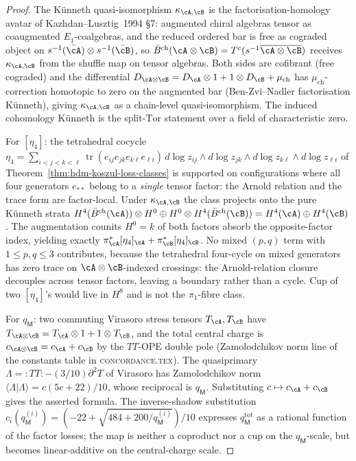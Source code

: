 \begin{proof}
The K\"unneth quasi-isomorphism $\kappa_{\cA,\cB}$ is the
factorisation-homology avatar of
Kazhdan--Lusztig~\textup{1994 §7}: augmented chiral algebras tensor
as coaugmented $E_1$-coalgebras, and the reduced ordered bar is
free as cograded object on $s^{-1}(\bar\cA)\otimes s^{-1}(\bar\cB)$,
so $\bar B^{\mathrm{ch}}(\cA\otimes\cB) = T^c(s^{-1}\overline{\cA\otimes\cB})$
receives $\kappa_{\cA,\cB}$ from the shuffle map on tensor algebras.
Both sides are cofibrant (free cograded) and the differential
$D_{\cA\otimes\cB} = D_\cA\otimes 1 + 1\otimes D_\cB + \mu_{\mathrm{ch}}$
has $\mu_{\mathrm{ch}}$-correction homotopic to zero on the
augmented bar (Ben-Zvi--Nadler factorisation K\"unneth), giving
$\kappa_{\cA,\cB}$ as a chain-level quasi-isomorphism. The induced
cohomology K\"unneth is the split-$\mathrm{Tor}$ statement over a
field of characteristic zero.

For $[\eta_4]$: the tetrahedral cocycle
$\eta_4 = \sum_{i<j<k<\ell}\operatorname{tr}(e_{ij}e_{jk}e_{k\ell}e_{\ell i})\,
d\log z_{ij}\wedge d\log z_{jk}\wedge d\log z_{k\ell}\wedge d\log z_{\ell i}$
of Theorem~\ref{thm:hdm-koszul-loss-classes} is supported on
configurations where all four generators $e_{**}$ belong to a
\emph{single} tensor factor: the Arnold relation and the trace form
are factor-local. Under $\kappa_{\cA,\cB}$ the class projects
onto the pure K\"unneth strata $H^4(\bar B^{\mathrm{ch}}(\cA))\otimes
H^0 \oplus H^0 \otimes H^4(\bar B^{\mathrm{ch}}(\cB))
= H^4(\cA)\oplus H^4(\cB)$. The augmentation counits $H^0 = k$ of
both factors absorb the opposite-factor index, yielding exactly
$\pi_\cA^\ast[\eta_4]_\cA + \pi_\cB^\ast[\eta_4]_\cB$. No mixed
$(p,q)$ term with $1\le p,q\le 3$ contributes, because the
tetrahedral four-cycle on mixed generators has zero trace on
$\cA\otimes\cB$-indexed crossings: the Arnold-relation closure
decouples across tensor factors, leaving a boundary rather than a
cycle. Cup of two $[\eta_4]$'s would live in $H^8$ and is not
the $\pi_1$-fibre class.

For $q_\mathsf{M}$: two commuting Virasoro stress tensors
$T_\cA,T_\cB$ have $T_{\cA\otimes\cB} = T_\cA\otimes 1 + 1\otimes
T_\cB$, and the total central charge is $c_{\cA\otimes\cB} = c_\cA
+ c_\cB$ by the ${TT}$-OPE double pole (Zamolodchikov norm line of
the constants table in \textsc{concordance.tex}). The quasiprimary
$\Lambda = {:}TT{:} - (3/10)\partial^2 T$ of Virasoro has
Zamolodchikov norm $\langle\Lambda|\Lambda\rangle = c(5c+22)/10$,
whose reciprocal is $q_\mathsf{M}$. Substituting
$c\mapsto c_\cA+c_\cB$ gives the asserted formula. The
inverse-shadow substitution $c_i(q_\mathsf{M}^{(i)}) =
(-22+\sqrt{484+200/q_\mathsf{M}^{(i)}})/10$ expresses
$q_\mathsf{M}^{\mathrm{tot}}$ as a rational function of the factor
losses; the map is neither a coproduct nor a cup on the
$q_\mathsf{M}$-scale, but becomes linear-additive on the
central-charge scale.


\end{proof}
